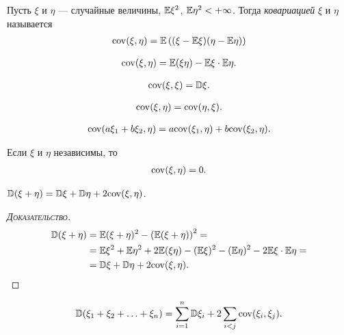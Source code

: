 \documentclass[../main.tex]{subfiles}
\begin{document}
\begin{df}[ковариация]
 Пусть $ \xi $ и $ \eta $ --- случайные величины, $ \mathbb E\xi^{2} $, $ \mathbb E\eta^{2} < +\infty$. Тогда \textit{ковариацией} $ \xi $ и $ \eta $ называется
 \begin{align*}
  \mathrm{cov}(\xi,\eta) = \mathbb E \left( (\xi - \mathbb E\xi)(\eta - \mathbb E\eta) \right)
 \end{align*} 
\end{df}
\begin{prop}
 \begin{align*}
  \mathrm{cov}(\xi,\eta) = \mathbb E(\xi\eta) - \mathbb E\xi \cdot \mathbb E\eta.
 \end{align*} 
\end{prop}
\begin{prop}
 \begin{align*}
  \mathrm{cov}(\xi,\xi) = \mathbb D\xi.
 \end{align*} 
\end{prop}
\begin{prop}
 \begin{align*}
  \mathrm{cov}(\xi,\eta) = \mathrm{cov}(\eta,\xi).
 \end{align*}
\end{prop}
\begin{prop}
 \begin{align*}
  \mathrm{cov}(a\xi_1 + b\xi_2, \eta) = a\mathrm{cov}(\xi_1,\eta) + b \mathrm{cov}(\xi_2, \eta).
 \end{align*} 
\end{prop}
\begin{prop}
 Если $ \xi $ и $ \eta $ независимы, то
 \begin{align*}
  \mathrm{cov}(\xi,\eta) = 0.
 \end{align*} 
\end{prop}
\begin{prop}
 $ \mathbb D(\xi + \eta) = \mathbb D\xi + \mathbb D\eta + 2\mathrm{cov}(\xi,\eta) $.
\end{prop}
\begin{proof}[\normalfont\textsc{Доказательство}]
 \begin{align*}
  \mathbb D(\xi+\eta) &= \mathbb E(\xi+\eta)^{2} - \left( \mathbb E(\xi+\eta) \right)^{2} = \\
  &= \mathbb E\xi^{2} + \mathbb E\eta^{2} + 2\mathbb E(\xi\eta) - (\mathbb E\xi)^{2} - (\mathbb E\eta)^{2} - 2\mathbb E\xi \cdot \mathbb E\eta = \\
  &= \mathbb D\xi + \mathbb D\eta +2\mathrm{cov}(\xi,\eta).
 \end{align*} 
\end{proof}
\begin{prop}
 \begin{align*}
  \mathbb D(\xi_1 + \xi_2 + \ldots + \xi_n) = \sum_{i=1}^{n} \mathbb D\xi_i + 2 \sum_{i < j} \mathrm{cov}(\xi_i, \xi_j).
 \end{align*} 
\end{prop}
\end{document}
